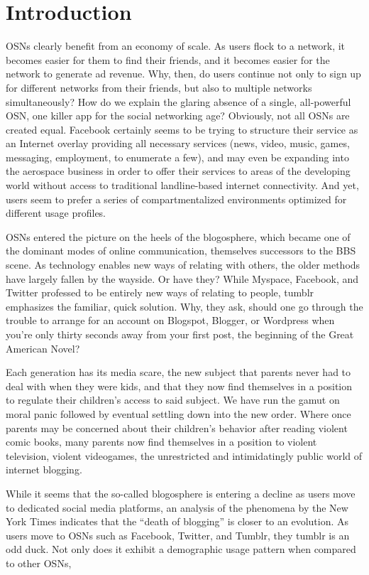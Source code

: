 \section{Introduction}
\label{sec:-intro}

OSNs clearly benefit from an economy of scale.  As users flock to a 
network, it becomes easier for them to find their friends, and it 
becomes easier for the network to generate ad revenue.  Why, then, 
do users continue not only to sign up for different networks from their 
friends, but also to multiple networks simultaneously?  How do we explain the 
glaring absence of a single, all-powerful OSN, one killer app for the 
social networking age?  Obviously, not all OSNs are created equal.  
Facebook certainly seems to be trying to structure their service 
as an Internet overlay providing all necessary services (news, video, 
music, games, messaging, employment, to enumerate a few), and may even 
be expanding into the aerospace business in order to offer their 
services to areas of the developing world without access to traditional 
landline-based internet connectivity.  And yet, users seem to prefer 
a series of compartmentalized environments optimized for different 
usage profiles.

OSNs entered the picture on the heels of the blogosphere, which became 
one of the dominant modes of online communication, themselves 
successors to the BBS scene.  As technology enables new ways of 
relating with others, the older methods have largely fallen by the 
wayside.  Or have they?  While Myspace, Facebook, and Twitter professed 
to be entirely new ways of relating to people, tumblr emphasizes the 
familiar, quick solution.  Why, they ask, should one go through the 
trouble to arrange for an account on Blogspot, Blogger, or Wordpress 
when you're only thirty seconds away from your first post, the 
beginning of the Great American Novel?


Each generation has its media scare, the new subject that parents 
never had to deal with when they were kids, and that they now find 
themselves in a position to regulate their children's access to said 
subject.  We have run the gamut on moral panic followed by eventual 
settling down into the new order.  Where once parents may be concerned 
about their children's behavior after reading violent comic books, many 
parents now find themselves in a position to
violent television, violent videogames, the unrestricted and 
intimidatingly public world of internet blogging.

While it seems that the so-called blogosphere is entering a decline 
as users move to dedicated social media platforms, an analysis of the 
phenomena by the New York Times\cite{kopytoff2011blogs} indicates that 
the ``death of blogging'' is closer to an evolution.  As users move to 
OSNs such as Facebook, Twitter, and Tumblr, they
tumblr is an odd duck.  Not only does it exhibit a demographic usage 
pattern when compared to other OSNs,

